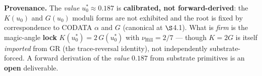 \noindent\textbf{Provenance.} The \emph{value} $u_0^* \approx 0.187$ is \textbf{calibrated, not forward-derived}: the $K(u_0)$ and $G(u_0)$ moduli forms are not exhibited and the root is fixed by correspondence to CODATA $\alpha$ and $G$ (canonical at  $\S$4.1). What is \emph{firm} is the magic-angle \textbf{lock} $K(u_0^*) = 2\,G(u_0^*)$ with $\nu_{\mathrm{Hill}} = 2/7$ --- though $K = 2G$ is itself \emph{imported} from GR (the trace-reversal identity), not independently substrate-forced. A forward derivation of the \emph{value} $0.187$ from substrate primitives is an \textbf{open} deliverable.

